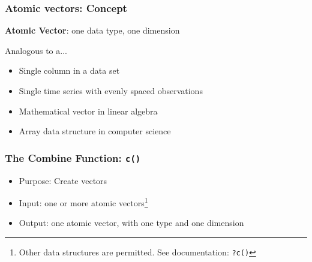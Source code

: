 \documentclass{beamer}
\newcommand{\R}[1]{\texttt{#1}}
\begin{document}
\begin{frame}[fragile]
\frametitle{Atomic vectors: Concept}

\textbf{Atomic Vector}: one data type, one dimension
\pause

Analogous to a...
\begin{itemize}
\item<1-> Single column in a data set
\item<1-> Single time series with evenly spaced observations
\item<1-> Mathematical vector in linear algebra
\item<1-> Array data structure in computer science
\end{itemize}

\end{frame}


\begin{frame}[fragile]
\frametitle{The Combine Function: \R{c()}}

\begin{itemize}
\item Purpose: Create vectors
\item Input: one or more atomic vectors\footnote{Other data structures are permitted. See documentation: \R{?c()}}
\item Output: one atomic vector, with one type and one dimension
\end{itemize}

\end{frame}
\end{document}
